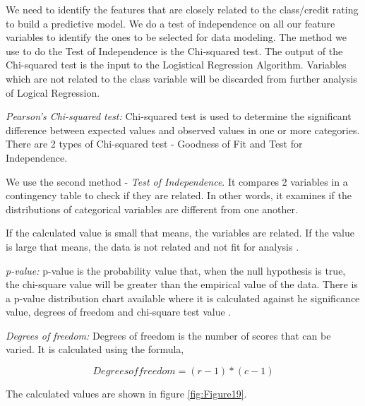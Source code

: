 \documentclass[sigconf]{acmart}
\begin{document}
We need to identify the features that are closely related to the class/credit rating to build a predictive model. We do a test of independence on all our feature variables to identify the ones to be selected for data modeling. The method we use to do the Test of Independence is the Chi-squared test. The output of the Chi-squared test is the input to the Logistical Regression Algorithm. Variables which are not related to the class variable will be discarded from further analysis of Logical Regression. 

\textit{Pearson's Chi-squared test:} Chi-squared test is used to determine the significant difference between expected values and observed values in one or more categories. There are 2 types of Chi-squared test - Goodness of Fit and Test for Independence. 

We use the second method - \emph{Test of Independence}. It compares 2 variables in a contingency table to check if they are related. In other words, it examines if the distributions of categorical variables are different from one another. 


If the calculated value is small that means, the variables are related. If the value is large that means, the data is not related and not fit for analysis \cite{chi-square}.

\textit{p-value:} p-value is the probability value that, when the null hypothesis is true, the chi-square value will be greater than the empirical value of the data. There is a p-value distribution chart available where it is calculated against he significance value, degrees of freedom and chi-square test value \cite{p-value}.

\textit{Degrees of freedom:} Degrees of freedom is the number of scores that can be varied. It is calculated using the formula,

\begin{equation}
Degrees of freedom = (r-1)*(c-1)
\end{equation}

The calculated values are shown in figure \ref{fig:Figure19}.
\end{document}
